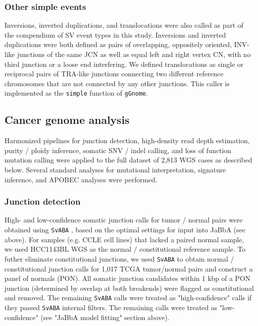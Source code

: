 \documentclass[phd,tocprelim]{cornell}
\newcommand{\ttt}[1]{\texttt{#1}}
\begin{document}
\subsubsection*{Other simple events}

Inversions, inverted duplications, and translocations were also called as part of the compendium of SV event types in this study. Inversions and inverted duplications were both defined as pairs of overlapping, oppositely oriented, INV-like junctions of the same JCN as well as equal left and right vertex CN, with no third junction or a loose end interfering. We defined translocations as single or reciprocal pairs of TRA-like junctions connecting two different reference chromosomes that are not connected by any other junctions.  This caller is implemented as the \ttt{simple} function of \ttt{gGnome}.

\subsection*{Cancer genome analysis} Harmonized pipelines for junction detection, high-density read depth estimation, purity / ploidy inference, somatic SNV / indel calling, and loss of function mutation calling were applied to the full dataset of 2,813 WGS cases as described below. Several standard analyses for mutational interpretation, signature inference, and APOBEC analyses were performed.

\subsubsection*{Junction detection}

High- and low-confidence somatic junction calls for tumor / normal pairs were obtained using \texttt{SvABA} \cite{wala2018}, based on the optimal settings for input into JaBbA (see above). For samples (e.g. CCLE cell lines) that lacked a paired normal sample, we used HCC1143BL WGS as the normal / constitutional reference sample.
To futher eliminate constitutional junctions, we used \texttt{SvABA} to obtain normal / constitutional junction calls for 1,017 TCGA tumor/normal pairs and construct a panel of normals (PON).  All somatic junction candidates within 1 kbp of a PON junction (determined by overlap at both breakends) were flagged as constitutional and removed.  The remaining \texttt{SvABA} calls were treated as "high-confidence" calls if they passed \texttt{SvABA} internal filters.  The remaining calls were treated as "low-confidence" (see "JaBbA model fitting" section above).
\end{document}

